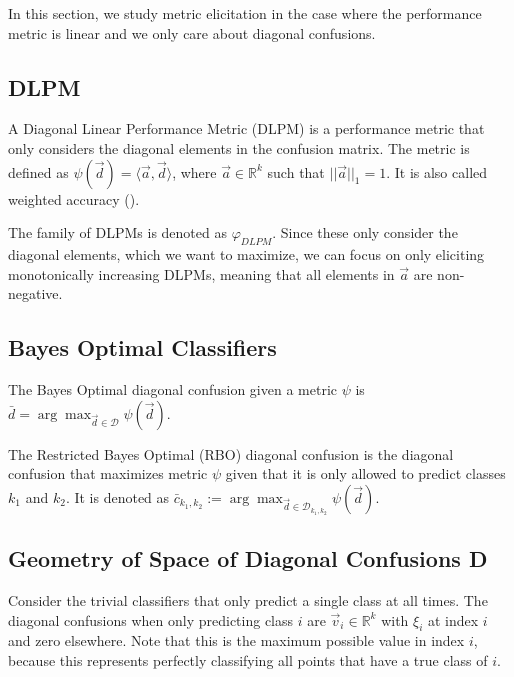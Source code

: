 \documentclass[
  letterpaper,
  numbers=noenddot,
  DIV=11,
  oneside]{scrreprt}
\theoremstyle{remark}
\begin{document}
In this section, we study metric elicitation in the case where the
performance metric is linear and we only care about diagonal confusions.

\subsection{DLPM}\label{dlpm}

A Diagonal Linear Performance Metric (DLPM) is a performance metric that
only considers the diagonal elements in the confusion matrix. The metric
is defined as \(\psi(\vec{d}) = \langle \vec{a}, \vec{d} \rangle\),
where \(\vec{a} \in \mathbb{R}^k\) such that \(||\vec{a}||_1 = 1\). It
is also called weighted accuracy
().

The family of DLPMs is denoted as \(\varphi_{DLPM}\). Since these only
consider the diagonal elements, which we want to maximize, we can focus
on only eliciting monotonically increasing DLPMs, meaning that all
elements in \(\vec{a}\) are non-negative.

\subsection{Bayes Optimal Classifiers}\label{bayes-optimal-classifiers}

The Bayes Optimal diagonal confusion given a metric \(\psi\) is
\(\bar{d} = \arg\max_{\vec{d} \in \mathcal{D}} \psi(\vec{d})\).

The Restricted Bayes Optimal (RBO) diagonal confusion is the diagonal
confusion that maximizes metric \(\psi\) given that it is only allowed
to predict classes \(k_1\) and \(k_2\). It is denoted as
\(\bar{c}_{k_1, k_2} := \arg\max_{\vec{d} \in \mathcal{D}_{k_1, k_2}} \psi(\vec{d})\).

\subsection{Geometry of Space of Diagonal Confusions
D}\label{geometry-of-space-of-diagonal-confusions-d}

Consider the trivial classifiers that only predict a single class at all
times. The diagonal confusions when only predicting class \(i\) are
\(\vec{v}_i \in \mathbb{R}^k\) with \(\xi_i\) at index \(i\) and zero
elsewhere. Note that this is the maximum possible value in index \(i\),
because this represents perfectly classifying all points that have a
true class of \(i\).
\end{document}
